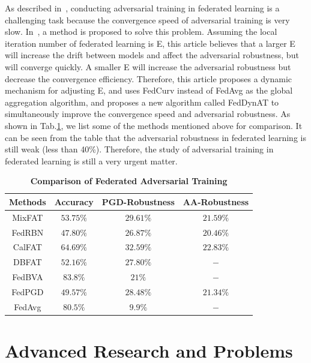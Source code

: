 \documentclass[pdflatex,sn-mathphys-num]{sn-jnl}%
\theoremstyle{thmstyleone}%
\theoremstyle{thmstyletwo}%
\theoremstyle{thmstylethree}%
\begin{document}
As described in~\cite{zhang2023delving}, conducting adversarial training
in federated learning is a challenging task because the
convergence speed of adversarial training is very slow.
In~\cite{shah2021adversarial}, a method is proposed to solve this problem.
Assuming the local iteration number of federated learning
is E, this article believes that a larger E will increase the
drift between models and affect the adversarial robustness,
but will converge quickly. A smaller E will increase
the adversarial robustness but decrease the convergence
eﬀiciency. Therefore, this article proposes a dynamic
mechanism for adjusting E, and uses FedCurv instead of
FedAvg as the global aggregation algorithm, and proposes
a new algorithm called FedDynAT to simultaneously
improve the convergence speed and adversarial robustness.
As shown in Tab.\ref{Comparison of FAT}, we list some of the methods
mentioned above for comparison. It can be seen from the
table that the adversarial robustness in federated learning
is still weak (less than 40\%). Therefore, the study of
adversarial training in federated learning is still a very
urgent matter.


\begin{table}[t]
    \caption{\textbf{Comparison of Federated Adversarial Training}}
    \label{Comparison of FAT}
    \centering
    \begin{tabular}{|c|c|c|c|} %
    \toprule %
    \textbf{Methods}  & \textbf{Accuracy} & \textbf{PGD-Robustness} & \textbf{AA-Robustness}\\ 
    \midrule
     MixFAT& $53.75\%$ &   $29.61\%$ &   $21.59\%$ \\
     \midrule
     FedRBN& $47.80\%$ &  $26.87\%$ & $20.46\%$ \\
     \midrule
     CalFAT& $64.69\%$ & $32.59\%$  & $22.83\%$ \\
     \midrule
     DBFAT& $52.16\%$ &  $27.80\%$ & $-$ \\
     \midrule
     FedBVA& $83.8\%$ &  $21\%$ & $-$ \\
     \midrule
     FedPGD& $49.57\%$ &  $28.48\%$ &  $21.34\%$ \\
     \midrule
     FedAvg& $80.5\%$ &  $9.9\%$ & $-$ \\
    \toprule
    \end{tabular}
    \end{table}  


    \section{Advanced Research and Problems}
    \label{Advanced Research and Problems}
\end{document}
